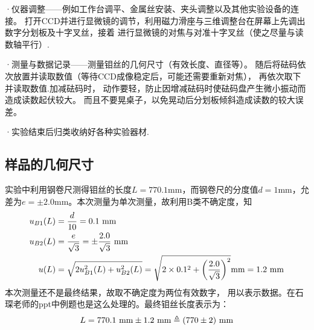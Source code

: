 \documentclass[11pt]{article}
\begin{document}
·仪器调整——例如工作台调平、金属丝安装、夹头调整以及其他实验设备的连接。
打开CCD并进行显微镜的调节，利用磁力滑座与三维调整台在屏幕上先调出数字分划板及十字叉丝，接着
进行显微镜的对焦与对准十字叉丝（使之尽量与读数轴平行）.

·测量与数据记录——测量钼丝的几何尺寸（有效长度、直径等）。
随后将砝码依次放置并读取数值（等待CCD成像稳定后，可能还需要重新对焦），
再依次取下并读取数值.加减砝码时，
动作要轻，防止因增减砝码时使砝码盘产生微小振动而造成读数起伏较大。
而且不要晃桌子，以免晃动后分划板倾斜造成读数的较大误差。

·实验结束后归类收纳好各种实验器材.






\subsection{样品的几何尺寸}


实验中利用钢卷尺测得钼丝的长度$L=770.1$mm，而钢卷尺的分度值$d=1$mm，允差为$e=\pm 2.0$mm。本次测量为单次测量，故利用B类不确定度，知
\begin{align*}
    u_{B1}(L)& =\frac{d}{10}=0.1  \,\,{\rm mm} \\
     u_{B2}(L)&=\frac{e}{\sqrt 3}=\pm \frac{2.0}{\sqrt 3} \,\,{\rm mm}\\
   u(L) & =\sqrt{2u_{B1}^2(L)+u^2_{B2}(L)} =\sqrt{2\times0.1^2+\left(\frac{2.0}{\sqrt3 }\right)^2}{\rm mm}=1.2 \,\,{\rm mm}
\end{align*}
本次测量还不是最终结果，故取不确定度为两位有效数字，
用以表示数据。在石琛老师的ppt中例题也是这么处理的。最终钼丝长度表示为：
\[
   L=770.1\,\,{\rm mm} \pm 1.2\,\,{\rm mm}  \triangleq(770\pm 2)\,\,{\rm mm}
\]
\end{document}
